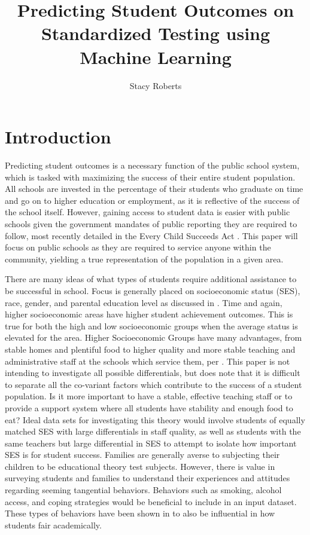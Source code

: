 \documentclass[man,floatsintext]{apa6} %
\title{Predicting Student Outcomes on Standardized Testing using Machine Learning}
\author{Stacy Roberts}
\affiliation{The University of Texas at Austin \\ December 2024}
\begin{document}
\maketitle

\section{Introduction}

Predicting student outcomes is a necessary function of the public school system, which is tasked with maximizing the success of their entire student population. All schools are invested in the percentage of their students who graduate on time and go on to higher education or employment, as it is reflective of the success of the school itself. However, gaining access to student data is easier with public schools given the government mandates of public reporting they are required to follow, most recently detailed in the Every Child Succeeds Act \cite{ecsa}. This paper will focus on public schools as they are required to service anyone within the community, yielding a true representation of the population in a given area.

There are many ideas of what types of students require additional assistance to be successful in school. Focus is generally placed on socioeconomic status (SES), race, gender, and parental education level as discussed in \cite{Bradley2022SESgap}.  Time and again, higher socioeconomic areas have higher student achievement outcomes. This is true for both the high and low socioeconomic groups when the average status is elevated for the area.  Higher Socioeconomic Groups have many advantages, from stable homes and plentiful food to higher quality and more stable teaching and administrative staff at the schools which service them, per \cite{HSEffectsLongTerm}. This paper is not intending to investigate all possible differentials, but does note that it is difficult to separate all the co-variant factors which contribute to the success of a student population. Is it more important to have a stable, effective teaching staff or to provide a support system where all students have stability and enough food to eat? Ideal data sets for investigating this theory would involve students of equally matched SES with large differentials in staff quality, as well as students with the same teachers but large differential in SES to attempt to isolate how important SES is for student success. Families are generally averse to subjecting their children to be educational theory test subjects. However, there is value in surveying students and families to understand their experiences and attitudes regarding seeming tangential behaviors. Behaviors such as smoking, alcohol access, and coping strategies would be beneficial to include in an input dataset. These types of behaviors have been shown in \cite{tiertaryBehaviors} to also be influential in how students fair academically.
\end{document}
